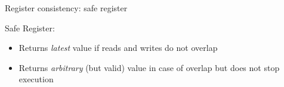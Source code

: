 \begin{frame}{Register consistency: safe register}

Safe Register:
\begin{itemize}
  \item Returns \textit{latest} value if reads and writes do not overlap 
  \item Returns \textit{arbitrary} (but valid) value in case of overlap but does not stop execution
\end{itemize}

\pause



\end{frame}

